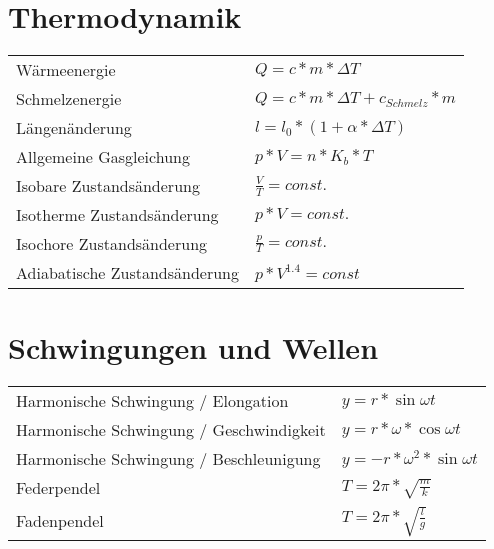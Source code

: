 \documentclass[12pt,a4paper]{paper}
\begin{document}
\section{Thermodynamik}
\begin{tabularx}{\textwidth}{X|X}
	Wärmeenergie & $Q=c*m*\Delta T$\\
	Schmelzenergie & $Q = c*m*\Delta T + c_{Schmelz} * m$\\
	Längenänderung & $l = l_0 * (1 + \alpha * \Delta T)$\\
	Allgemeine Gasgleichung & $p*V = n *K_b * T$\\
	Isobare Zustandsänderung & $\frac{V}{T} = const.$\\
	Isotherme Zustandsänderung & $p*V = const.$\\
	Isochore Zustandsänderung & $\frac{p}{T} = const.$\\
	Adiabatische Zustandsänderung & $p * V^{1.4} = const$
\end{tabularx}
\section{Schwingungen und Wellen}
\begin{tabularx}{\textwidth}{X|X}
Harmonische Schwingung / Elongation & $y = r * \sin{\omega t}$\\
Harmonische Schwingung / Geschwindigkeit & $y = r * \omega * \cos{\omega t}$\\
Harmonische Schwingung / Beschleunigung & $y = -r * \omega^2 * \sin{\omega t}$\\
Federpendel & $T = 2\pi * \sqrt{\frac{m}{k}}$\\
Fadenpendel & $T= 2\pi * \sqrt{\frac{l}{g}}$\\
\end{tabularx}
\end{document}
